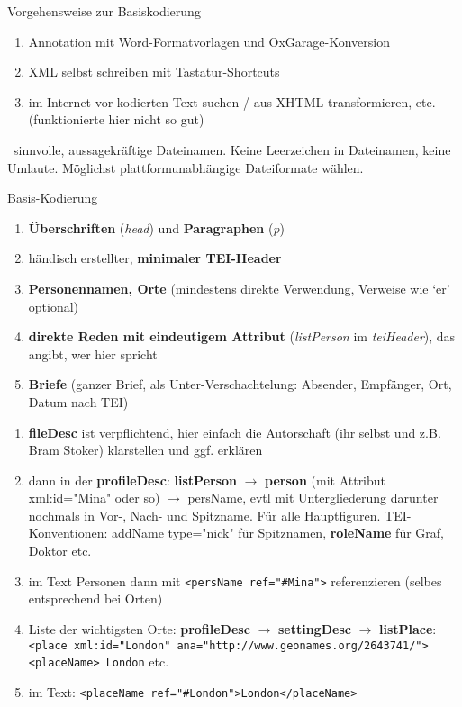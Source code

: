 \begin{frame}[allowframebreaks]{Vorgehensweise zur Basiskodierung}
\footnotesize
\begin{enumerate}
    \item Annotation mit Word-Formatvorlagen und OxGarage-Konversion
    \item XML selbst schreiben mit Tastatur-Shortcuts
    \item im Internet vor-kodierten Text suchen / aus XHTML transformieren, etc. (funktionierte hier nicht so gut)
\end{enumerate}
\smallskip

~sinnvolle, aussagekräftige Dateinamen. Keine Leerzeichen in Dateinamen, keine Umlaute. Möglichst plattformunabhängige Dateiformate wählen.


\end{frame}

\begin{frame}[allowframebreaks]{Basis-Kodierung}

\begin{enumerate}
    \item \textbf{Überschriften} (\emph{head}) und \textbf{Paragraphen} (\emph{p})
    \item händisch erstellter, \textbf{minimaler TEI-Header}
    \item \textbf{Personennamen, Orte} (mindestens direkte Verwendung, Verweise wie `er' optional)
    \item \textbf{direkte Reden mit eindeutigem Attribut} (\emph{listPerson} im \emph{teiHeader}), das angibt, wer hier spricht
    \item \textbf{Briefe} (ganzer Brief, als Unter-Verschachtelung: Absender, Empfänger, Ort, Datum nach TEI)
\end{enumerate}

\begin{enumerate}
    \item \textbf{fileDesc} ist verpflichtend, hier einfach die Autorschaft (ihr selbst und z.B. Bram Stoker) klarstellen und ggf. erklären
    \item dann in der \textbf{profileDesc}: \textbf{listPerson} $\to$ \textbf{person} (mit Attribut xml:id="Mina" oder so)  $\to$ persName, evtl mit Untergliederung darunter nochmals in Vor-, Nach- und Spitzname. Für alle Hauptfiguren. TEI-Konventionen: \href{http://www.tei-c.org/release/doc/tei-p5-doc/de/html/examples-addName.html}{addName} type="nick" für Spitznamen, \textbf{roleName} für Graf, Doktor etc.
    \item im Text Personen dann mit \texttt{<persName ref="#Mina">} referenzieren (selbes entsprechend bei Orten)
    \item Liste der wichtigsten Orte: \textbf{profileDesc} $\to$ \textbf{settingDesc} $\to$ \textbf{listPlace}: \texttt{<place xml:id="London"  ana="http://www.geonames.org/2643741/"> <placeName> London} etc.
    \item im Text: \texttt{<placeName ref="#London">London</placeName>}
\end{enumerate}

\end{frame}

